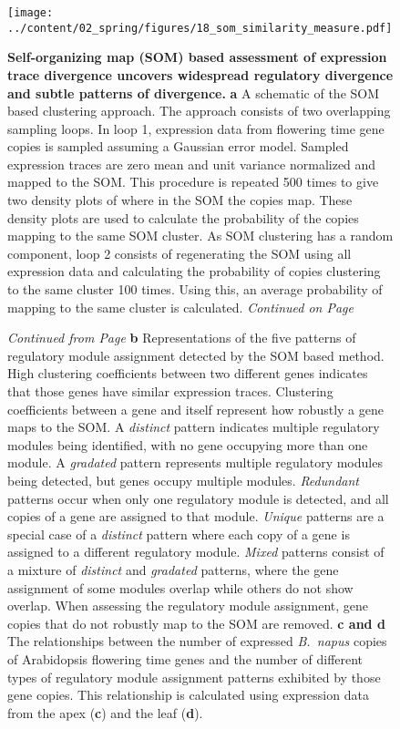 \documentclass[12pt,]{book}
\begin{document}
\begin{figure}[htbp]
\centering
\texttt{[image: ../content/02\_spring/figures/18\_som\_similarity\_measure.pdf]}
\caption{\textbf{Self-organizing map (SOM) based assessment of
expression trace divergence uncovers widespread regulatory divergence
and subtle patterns of divergence.} \textbf{a} A schematic of the SOM
based clustering approach. The approach consists of two overlapping
sampling loops. In loop 1, expression data from flowering time gene
copies is sampled assuming a Gaussian error model. Sampled expression
traces are zero mean and unit variance normalized and mapped to the SOM.
This procedure is repeated 500 times to give two density plots of where
in the SOM the copies map. These density plots are used to calculate the
probability of the copies mapping to the same SOM cluster. As SOM
clustering has a random component, loop 2 consists of regenerating the
SOM using all expression data and calculating the probability of copies
clustering to the same cluster 100 times. Using this, an average
probability of mapping to the same cluster is calculated.
\emph{Continued on Page
\pageref{figure:218:somsimilaritylegend}}}\label{figure:218:somsimilarity}
\end{figure}

\addtocounter{figure}{-1}

\begin{figure} [t!]
\caption{\emph{Continued from Page \pageref{figure:218:somsimilarity}} \textbf{b} Representations of the five patterns of regulatory module assignment detected by the SOM based method. High clustering coefficients between two different genes indicates that those genes have similar expression traces. Clustering coefficients between a gene and itself represent how robustly a gene maps to the SOM. A \emph{distinct} pattern indicates multiple regulatory modules being identified, with no gene occupying more than one module. A \emph{gradated} pattern represents multiple regulatory modules being detected, but genes occupy multiple modules. \emph{Redundant} patterns occur when only one regulatory module is detected, and all copies of a gene are assigned to that module. \emph{Unique} patterns are a special case of a \emph{distinct} pattern where each copy of a gene is assigned to a different regulatory module. \emph{Mixed} patterns consist of a mixture of \emph{distinct} and \emph{gradated} patterns, where the gene assignment of some modules overlap while others do not show overlap. When assessing the regulatory module assignment, gene copies that do not robustly map to the SOM are removed. \textbf{c and d} The relationships between the number of expressed \emph{B.\ napus} copies of Arabidopsis flowering time genes and the number of different types of regulatory module assignment patterns exhibited by those gene copies. This relationship is calculated using expression data from the apex (\textbf{c}) and the leaf (\textbf{d}).}%
\label{figure:218:somsimilaritylegend}
\end{figure}
\end{document}
